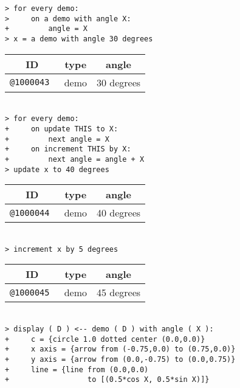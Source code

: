 \documentclass[12pt]{article}
\newenvironment{indpar}[1][0.3in]%
	{\begin{list}{}%
		     {\setlength{\itemsep}{0in}%
		      \setlength{\topsep}{0in}%
		      \setlength{\parsep}{1ex}%
		      \setlength{\labelwidth}{#1}%
		      \setlength{\leftmargin}{#1}%
		      \addtolength{\leftmargin}{\labelsep}}%
	 \item}%
	{\end{list}}
\begin{document}
\begin{indpar}
\verb|> for every demo:| \\
\verb|>     on a demo with angle X:| \\
\verb|+         angle = X| \\
\verb|> x = a demo with angle 30 degrees| \\
\begin{tabular}{|r|r|r|}
\hline
\multicolumn{1}{|c}{\bf ID} &
\multicolumn{1}{|c}{\bf type} &
\multicolumn{1}{|c|}{\bf angle} \\
\hline
\tt @1000043 & demo & 30 degrees \\
\hline
\end{tabular} \\[0.5ex]
\verb|> for every demo:| \\
\verb|+     on update THIS to X:|\\
\verb|+         next angle = X| \\
\verb|+     on increment THIS by X:| \\
\verb|+         next angle = angle + X| \\
\verb|> update x to 40 degrees| \\
\begin{tabular}{|r|r|r|}
\hline
\multicolumn{1}{|c}{\bf ID} &
\multicolumn{1}{|c}{\bf type} &
\multicolumn{1}{|c|}{\bf angle} \\
\hline
\tt @1000044 & demo & 40 degrees \\
\hline
\end{tabular} \\[0.5ex]
\verb|> increment x by 5 degrees| \\
\begin{tabular}{|r|r|r|}
\hline
\multicolumn{1}{|c}{\bf ID} &
\multicolumn{1}{|c}{\bf type} &
\multicolumn{1}{|c|}{\bf angle} \\
\hline
\tt @1000045 & demo & 45 degrees \\
\hline
\end{tabular} \\[0.5ex]
\verb|> display ( D ) <-- demo ( D ) with angle ( X ):| \\
\verb|+     c = {circle 1.0 dotted center (0.0,0.0)}| \\
\verb|+     x axis = {arrow from (-0.75,0.0) to (0.75,0.0)}| \\
\verb|+     y axis = {arrow from (0.0,-0.75) to (0.0,0.75)}| \\
\verb|+     line = {line from (0.0,0.0)| \\
\verb|+                  to [(0.5*cos X, 0.5*sin X)]}| \\

\end{indpar}
\end{document}
